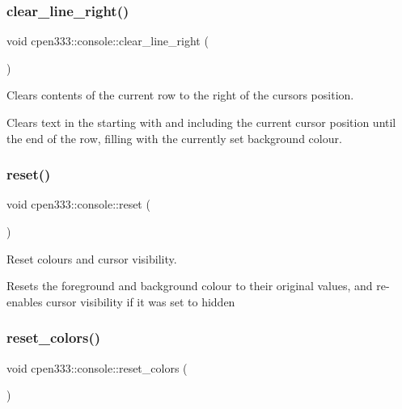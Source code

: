 \subsubsection{\texorpdfstring{clear\+\_\+line\+\_\+right()}{clear\_line\_right()}}
{\footnotesize\ttfamily void cpen333\+::console\+::clear\+\_\+line\+\_\+right (\begin{DoxyParamCaption}{ }\end{DoxyParamCaption})\hspace{0.3cm}{\ttfamily [inline]}}



Clears contents of the current row to the right of the cursor\textquotesingle{}s position. 

Clears text in the starting with and including the current cursor position until the end of the row, filling with the currently set background colour. \mbox{\label{classcpen333_1_1console_adf76613205b18ce6030ad6d31b089d73}} 
\subsubsection{\texorpdfstring{reset()}{reset()}}
{\footnotesize\ttfamily void cpen333\+::console\+::reset (\begin{DoxyParamCaption}{ }\end{DoxyParamCaption})\hspace{0.3cm}{\ttfamily [inline]}}



Reset colours and cursor visibility. 

Resets the foreground and background colour to their original values, and re-\/enables cursor visibility if it was set to hidden \mbox{\label{classcpen333_1_1console_a20094148348d3cbb9e59ec0833fc6d3a}} 
\subsubsection{\texorpdfstring{reset\+\_\+colors()}{reset\_colors()}}
{\footnotesize\ttfamily void cpen333\+::console\+::reset\+\_\+colors (\begin{DoxyParamCaption}{ }\end{DoxyParamCaption})\hspace{0.3cm}{\ttfamily [inline]}}



